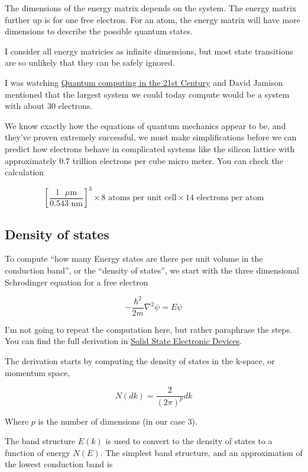 The dimensions of the energy matrix depends on the system. The energy
matrix further up is for one free electron. For an atom, the energy
matrix will have more dimensions to describe the possible quantum
states.

I consider all energy matricies as infinite dimensions, but most state
transitions are so unlikely that they can be safely ignored.

I was watching \href{https://youtu.be/zxml8UQSwC0}{Quantum computing in
the 21st Century} and David Jamison mentioned that the largest system we
could today compute would be a system with about 30 electrons.

We know exactly how the equations of quantum mechanics appear to be, and
they've proven extremely successful, we must make simplifications before
we can predict how electrons behave in complicated systems like the
silicon lattice with approximately 0.7 trillion electrons per cube micro
meter. You can check the calculation

\[ \left[\frac{1 \text{ }\mu\text{m}}{ 0.543\text{ nm}}\right]^3 \times 8 \text{ atoms per unit
 cell} \times 14 \text{ electrons per atom}\]

\subsection{Density of states}\label{density-of-states}

To compute ``how many Energy states are there per unit volume in the
conduction band'', or the ``density of states'', we start with the three
dimensional Schrodinger equation for a free electron

\[-\frac{\hbar^2}{2m}\nabla^2\psi = E\psi\]

I'm not going to repeat the computation here, but rather paraphrase the
steps. You can find the full derivation in
\href{https://www.amazon.com/Solid-State-Electronic-Devices-7th/dp/0133356035}{Solid
State Electronic Devices}.

The derivation starts by computing the density of states in the k-space,
or momentum space,

\[N(dk) = \frac{2}{(2 \pi)^p} dk\]

Where \(p\) is the number of dimensions (in our case 3).

The band structure \(E(k)\) is used to convert to the density of states
to a function of energy \(N(E)\). The simplest band structure, and an
approximation of the lowest conduction band is

